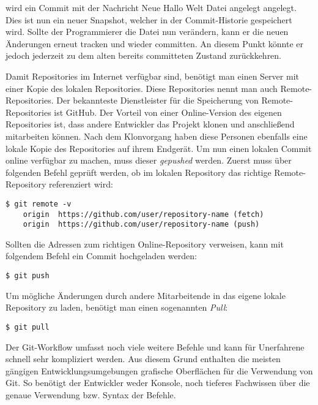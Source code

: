 wird ein Commit mit der Nachricht \glqq Neue Hallo Welt Datei angelegt\grqq{}
angelegt. Dies ist nun ein neuer Snapshot, welcher in der Commit-Historie
gespeichert wird. Sollte der Programmierer die Datei nun verändern, kann er die
neuen Änderungen erneut tracken und wieder committen. An diesem Punkt könnte er
jedoch jederzeit zu dem alten bereits committeten Zustand zurückkehren.

Damit Repositories im Internet verfügbar sind, benötigt man einen Server mit
einer Kopie des lokalen Repositories. Diese Repositories nennt man auch
Remote-Repositories. Der bekannteste Dienstleister für die Speicherung
von Remote-Repositories ist GitHub. Der Vorteil von einer Online-Version des
eigenen Repositories ist, dass andere Entwickler das Projekt klonen und
anschließend mitarbeiten können. Nach dem Klonvorgang haben diese Personen
ebenfalls eine lokale Kopie des Repositories auf ihrem Endgerät. Um nun einen
lokalen Commit online verfügbar zu machen, muss dieser \emph{gepushed} werden.
Zuerst muss über folgenden Befehl geprüft werden, ob im lokalen Repository das
richtige Remote-Repository referenziert wird:

\begin{lstlisting}[style=Bash]
    $ git remote -v
    origin	https://github.com/user/repository-name (fetch)
    origin	https://github.com/user/repository-name (push)
\end{lstlisting}

Sollten die Adressen zum richtigen Online-Repository verweisen, kann mit
folgendem Befehl ein Commit hochgeladen werden:

\begin{lstlisting}[style=Bash]
    $ git push
\end{lstlisting}

Um mögliche Änderungen durch andere Mitarbeitende in das eigene lokale
Repository zu laden, benötigt man einen sogenannten \emph{Pull}:

\begin{lstlisting}[style=Bash]
    $ git pull
\end{lstlisting}


Der Git-Workflow umfasst noch viele weitere Befehle und kann für Unerfahrene
schnell sehr kompliziert werden. Aus diesem Grund enthalten die meisten gängigen
Entwicklungsumgebungen grafische Oberflächen für die Verwendung von Git. So
benötigt der Entwickler weder Konsole, noch tieferes Fachwissen über die genaue
Verwendung bzw. Syntax der Befehle.

